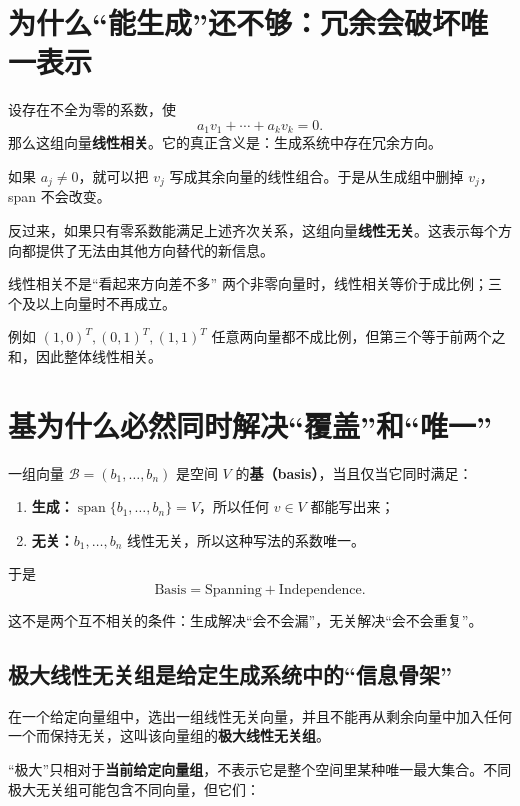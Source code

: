 \documentclass[11pt,a4paper]{ctexart}
\newcommand{\kw}[1]{\textbf{\color{deep}#1}}
\begin{document}
\section{为什么“能生成”还不够：冗余会破坏唯一表示}

设存在不全为零的系数，使
\[
a_1v_1+\cdots+a_kv_k=0.
\]
那么这组向量\kw{线性相关}。它的真正含义是：生成系统中存在冗余方向。

如果 $a_j\neq0$，就可以把 $v_j$ 写成其余向量的线性组合。于是从生成组中删掉 $v_j$，span 不会改变。

反过来，如果只有零系数能满足上述齐次关系，这组向量\kw{线性无关}。这表示每个方向都提供了无法由其他方向替代的新信息。

\begin{warnbox}{线性相关不是“看起来方向差不多”}
两个非零向量时，线性相关等价于成比例；三个及以上向量时不再成立。

例如 $(1,0)^T,(0,1)^T,(1,1)^T$ 任意两向量都不成比例，但第三个等于前两个之和，因此整体线性相关。
\end{warnbox}

\section{基为什么必然同时解决“覆盖”和“唯一”}

一组向量 $\mathcal B=(b_1,\dots,b_n)$ 是空间 $V$ 的\kw{基（basis）}，当且仅当它同时满足：

\begin{enumerate}
  \item \kw{生成：}$\operatorname{span}\{b_1,\dots,b_n\}=V$，所以任何 $v\in V$ 都能写出来；
  \item \kw{无关：}$b_1,\dots,b_n$ 线性无关，所以这种写法的系数唯一。
\end{enumerate}

于是
\[
\boxed{\text{Basis}=\text{Spanning}+\text{Independence}.}
\]

这不是两个互不相关的条件：生成解决“会不会漏”，无关解决“会不会重复”。

\subsection{极大线性无关组是给定生成系统中的“信息骨架”}

在一个给定向量组中，选出一组线性无关向量，并且不能再从剩余向量中加入任何一个而保持无关，这叫该向量组的\kw{极大线性无关组}。

“极大”只相对于\kw{当前给定向量组}，不表示它是整个空间里某种唯一最大集合。不同极大无关组可能包含不同向量，但它们：
\end{document}

